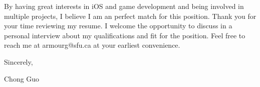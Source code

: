 \documentclass[10pt]{article} %
\begin{document}
\vspace{4mm}

By having great interests in iOS and game development and being involved in multiple projects, I believe I am an perfect match for this position. Thank you for your time reviewing my resume. I welcome the opportunity to discuss in a personal interview about my qualifications and fit for the position. Feel free to reach me at armourg@sfu.ca at your earliest convenience.

\vspace{4mm}

Sincerely,

\vspace{12mm}

Chong Guo

\end{document}
